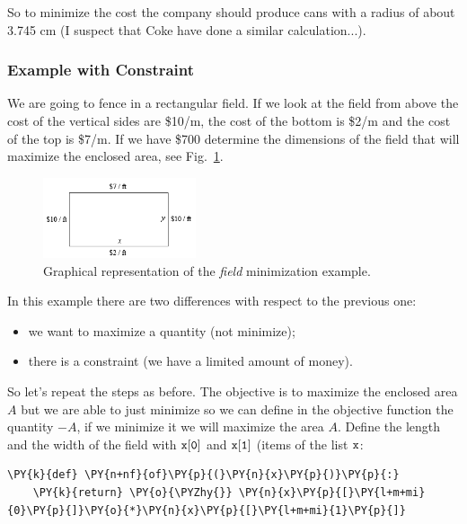     So to minimize the cost the company should produce cans with a radius of
about 3.745 cm (I suspect that Coke have done a similar calculation...).

\subsubsection{Example with Constraint}\label{example-with-constraint}

We are going to fence in a rectangular field. If we look at the field
from above the cost of the vertical sides are \$10/m, the cost of the
bottom is \$2/m and the cost of the top is \$7/m. If we have \$700 determine
the dimensions of the field that will maximize the enclosed area, see Fig.~\ref{fig:field}.

\begin{figure}[h]
\centering
\includegraphics[width=0.4\textwidth]{field.png}
\caption{Graphical representation of the \emph{field} minimization example.}
\label{fig:field}
\end{figure}

In this example there are two differences with respect to the previous one:

\begin{itemize}
\tightlist
\item
  we want to maximize a quantity (not minimize);
\item
  there is a constraint (we have a limited amount of money).
\end{itemize}

So let's repeat the steps as before. The objective is to maximize the
enclosed area \(A\) but we are able to just minimize so we can define in the objective function the quantity \(-A\), if we minimize it
we will maximize the area $A$. Define the length and the width of the field with \(\tt{x[0]}\) and
\(\tt{x[1]}\) (items of the list \(\tt{x}\):

    \begin{tcolorbox}[breakable, size=fbox, boxrule=1pt, pad at break*=1mm,colback=cellbackground, colframe=cellborder]
\begin{Verbatim}[commandchars=\\\{\}]
\PY{k}{def} \PY{n+nf}{of}\PY{p}{(}\PY{n}{x}\PY{p}{)}\PY{p}{:}
    \PY{k}{return} \PY{o}{\PYZhy{}} \PY{n}{x}\PY{p}{[}\PY{l+m+mi}{0}\PY{p}{]}\PY{o}{*}\PY{n}{x}\PY{p}{[}\PY{l+m+mi}{1}\PY{p}{]}
\end{Verbatim}
\end{tcolorbox}

